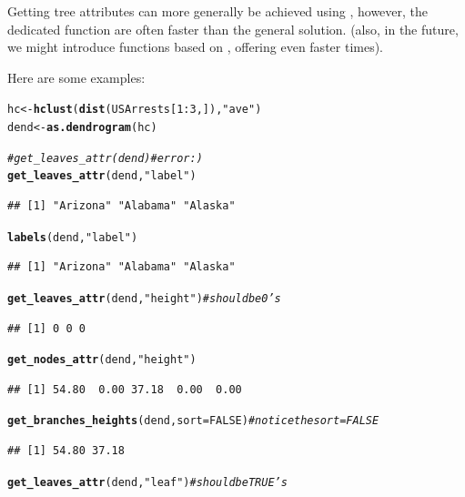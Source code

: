 \documentclass[shortnames,nojss,article]{jss}\usepackage[]{graphicx}\usepackage[]{color}
\makeatletter
\newcommand{\hlnum}[1]{\textcolor[rgb]{0.686,0.059,0.569}{#1}}%
\newcommand{\hlstr}[1]{\textcolor[rgb]{0.192,0.494,0.8}{#1}}%
\newcommand{\hlcom}[1]{\textcolor[rgb]{0.678,0.584,0.686}{\textit{#1}}}%
\newcommand{\hlopt}[1]{\textcolor[rgb]{0,0,0}{#1}}%
\newcommand{\hlstd}[1]{\textcolor[rgb]{0.345,0.345,0.345}{#1}}%
\newcommand{\hlkwb}[1]{\textcolor[rgb]{0.69,0.353,0.396}{#1}}%
\newcommand{\hlkwc}[1]{\textcolor[rgb]{0.333,0.667,0.333}{#1}}%
\newcommand{\hlkwd}[1]{\textcolor[rgb]{0.737,0.353,0.396}{\textbf{#1}}}%
\newenvironment{kframe}{%
 \def\at@end@of@kframe{}%
 \ifinner\ifhmode%
  \def\at@end@of@kframe{\end{minipage}}%
  \begin{minipage}{\columnwidth}%
 \fi\fi%
 \def\FrameCommand##1{\hskip\@totalleftmargin \hskip-\fboxsep
 \colorbox{shadecolor}{##1}\hskip-\fboxsep
     \hskip-\linewidth \hskip-\@totalleftmargin \hskip\columnwidth}%
 \MakeFramed {\advance\hsize-\width
   \@totalleftmargin\z@ \linewidth\hsize
   \@setminipage}}%
 {\par\unskip\endMakeFramed%
 \at@end@of@kframe}
\newenvironment{knitrout}{}{} %
\makeatother
\begin{document}
Getting tree attributes can more generally be achieved using , however, the dedicated function are often faster than the general solution. (also, in the future, we might introduce functions based on , offering even faster times).

Here are some examples:

\begin{knitrout}
\color{fgcolor}\begin{kframe}
\begin{alltt}
\hlstd{hc} \hlkwb{<-} \hlkwd{hclust}\hlstd{(}\hlkwd{dist}\hlstd{(USArrests[}\hlnum{1}\hlopt{:}\hlnum{3}\hlstd{, ]),} \hlstr{"ave"}\hlstd{)}
\hlstd{dend} \hlkwb{<-} \hlkwd{as.dendrogram}\hlstd{(hc}\hlstd{)}

\hlcom{# get_leaves_attr(dend) # error :)}
\hlkwd{get_leaves_attr}\hlstd{(dend,} \hlstr{"label"}\hlstd{)}
\end{alltt}
\begin{verbatim}
## [1] "Arizona" "Alabama" "Alaska"
\end{verbatim}
\begin{alltt}
\hlkwd{labels}\hlstd{(dend,} \hlstr{"label"}\hlstd{)}
\end{alltt}
\begin{verbatim}
## [1] "Arizona" "Alabama" "Alaska"
\end{verbatim}
\begin{alltt}
\hlkwd{get_leaves_attr}\hlstd{(dend,} \hlstr{"height"}\hlstd{)}  \hlcom{# should be 0's}
\end{alltt}
\begin{verbatim}
## [1] 0 0 0
\end{verbatim}
\begin{alltt}
\hlkwd{get_nodes_attr}\hlstd{(dend,} \hlstr{"height"}\hlstd{)}
\end{alltt}
\begin{verbatim}
## [1] 54.80  0.00 37.18  0.00  0.00
\end{verbatim}
\begin{alltt}
\hlkwd{get_branches_heights}\hlstd{(dend,} \hlkwc{sort} \hlstd{=} \hlnum{FALSE}\hlstd{)}  \hlcom{# notice the sort=FALSE}
\end{alltt}
\begin{verbatim}
## [1] 54.80 37.18
\end{verbatim}
\begin{alltt}
\hlkwd{get_leaves_attr}\hlstd{(dend,} \hlstr{"leaf"}\hlstd{)}  \hlcom{# should be TRUE's}

\end{alltt}
\end{kframe}
\end{knitrout}
\end{document}
